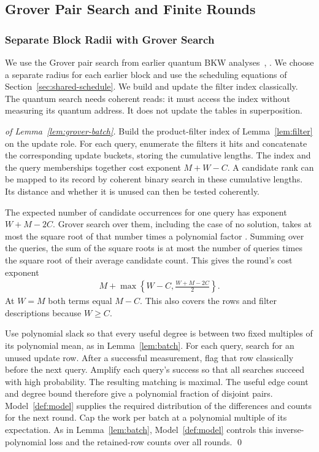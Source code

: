 \documentclass[runningheads,envcountsame,envcountsect,orivec]{llncs}
\begin{document}
\subsection{Grover Pair Search and Finite Rounds}
\label{app:grover-rounds}

\subsubsection{Separate Block Radii with Grover Search}


We use the Grover pair search from earlier quantum
BKW analyses~\cite[Section~II-D]{GJMS19},
\cite[Section~V]{M19}. We choose a separate radius for each earlier block
and use the scheduling equations of Section~\ref{sec:shared-schedule}. We build and
update the filter index classically. The quantum search needs
coherent reads: it must access the index without measuring its
quantum address. It does not update the tables in superposition.



\begin{proof}[of Lemma~\ref{lem:grover-batch}]
Build the product-filter index of Lemma~\ref{lem:filter}
on the update role. For each query, enumerate the filters it
hits and concatenate the corresponding update buckets, storing the
cumulative lengths. The index and the query memberships
together cost exponent $M+W-C$. A candidate rank can be
mapped to its record by coherent binary search in these
cumulative lengths. Its distance and whether it is unused
can then be tested coherently.

The expected number of candidate occurrences for one query
has exponent $W+M-2C$. Grover search over them, including
the case of no solution, takes at most the square root
of that number times a polynomial factor
\cite{BBHT98,BHMT02}. Summing over the queries, the sum of the
square roots is at most the number of queries times the square
root of their average candidate count. This gives the round's
cost exponent
\begin{align}
 M+\max\left\{W-C,\frac{W+M-2C}{2}\right\}.
 \label{eq:grover-stage}
\end{align}
At $W=M$ both terms equal $M-C$. This also covers the
rows and filter descriptions because $W\ge C$.

Use polynomial slack so that every useful degree is between
two fixed multiples of its polynomial mean, as in
Lemma~\ref{lem:batch}. For each query, search for an unused
update row. After a successful measurement, flag that row
classically before the next query. Amplify each query's
success so that all searches succeed with high probability.
The resulting matching is maximal. The useful edge count
and degree bound therefore give a polynomial fraction of
disjoint pairs. Model~\ref{def:model} supplies the required
distribution of the differences and counts for the next round.
Cap the work per batch at a polynomial multiple of its
expectation. As in Lemma~\ref{lem:batch}, Model~\ref{def:model}
controls this inverse-polynomial loss and the retained-row
counts over all rounds.
\qed
\end{proof}
\end{document}
